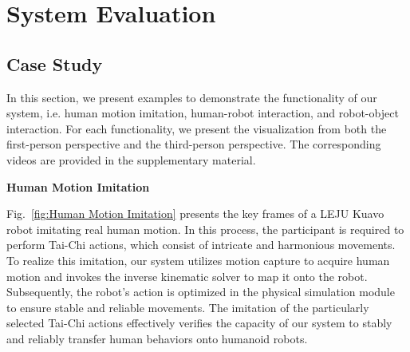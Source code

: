 \section{System Evaluation}
\label{sec:eval}




\subsection{Case Study}
In this section, we present examples to demonstrate the functionality of our system, i.e. human motion imitation, human-robot interaction, and robot-object interaction. For each functionality, we present the visualization from both the first-person perspective and the third-person perspective. The corresponding videos
are provided in the supplementary material.

\textbf{Human Motion Imitation}

Fig.~\ref{fig:Human Motion Imitation} presents the key frames of a LEJU Kuavo robot imitating real human motion. In this process, the participant is required to perform Tai-Chi actions, which consist of intricate and harmonious movements. To realize this imitation, our system utilizes motion capture to acquire human motion and invokes the inverse kinematic solver to map it onto the robot. Subsequently, the robot's action is optimized in the physical simulation module to ensure stable and reliable movements. The imitation of the particularly selected Tai-Chi actions effectively verifies the capacity of our system to stably and reliably transfer human behaviors onto humanoid robots. 

